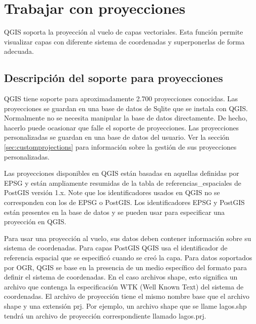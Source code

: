 
\section{Trabajar con proyecciones}\label{label_projections}

QGIS soporta la proyección al vuelo de capas vectoriales. Esta función permite visualizar capas con diferente sistema de coordenadas y superponerlas de forma adecuada.

\subsection{Descripción del soporte para proyecciones}\label{label_projoverview}

QGIS tiene soporte para aproximadamente 2.700 proyecciones conocidas. Las proyecciones se guardan en una base de datos de Sqlite que se instala con QGIS.
Normalmente no se necesita manipular la base de datos directamente. De hecho, hacerlo puede ocasionar que falle el soporte de proyecciones. Las proyecciones personalizadas se guardan en una base de datos del usuario. Ver la sección \ref{sec:customprojections} para información sobre la gestión de sus proyecciones personalizadas.

Las proyecciones disponibles en QGIS están basadas en aquellas definidas por EPSG y están ampliamente resumidas de la tabla de referencias\_espaciales de PostGIS versión 1.x. Note que los identificadores usados en QGIS no se corresponden con los de EPSG o PostGIS. Los identificadores EPSG y PostGIS están presentes en la base de datos y se pueden usar para especificar una proyección en QGIS.

Para usar una proyección al vuelo, sus datos deben contener información sobre su sistema de coordenadas. Para capas PostGIS QGIS usa el identificador de referencia espacial que se especificó cuando se creó la capa. Para datos soportados por OGR, QGIS se base en la presencia de un medio específico del formato para definir el sistema de coordenadas. En el caso archivos shape, esto significa un archivo que contenga la especificación WTK (Well Known Text)  del sistema de coordenadas. El archivo de proyección tiene el mismo nombre base que el archivo shape y una extensión prj. Por ejemplo, un archivo shape que se llame lagos.shp tendrá un archivo de proyección correspondiente llamado lagos.prj.

